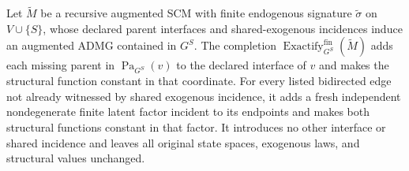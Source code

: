 Let \(\widetilde M\) be a recursive augmented SCM with finite endogenous signature \(\widetilde\sigma\) on \(V\cup\{S\}\), whose declared parent interfaces and shared-exogenous incidences induce an augmented ADMG contained in \(G^S\). The completion \(\operatorname{Exactify}^{\mathrm{fin}}_{G^S}(\widetilde M)\) adds each missing parent in \(\operatorname{Pa}_{G^S}(v)\) to the declared interface of \(v\) and makes the structural function constant in that coordinate. For every listed bidirected edge not already witnessed by shared exogenous incidence, it adds a fresh independent nondegenerate finite latent factor incident to its endpoints and makes both structural functions constant in that factor. It introduces no other interface or shared incidence and leaves all original state spaces, exogenous laws, and structural values unchanged.